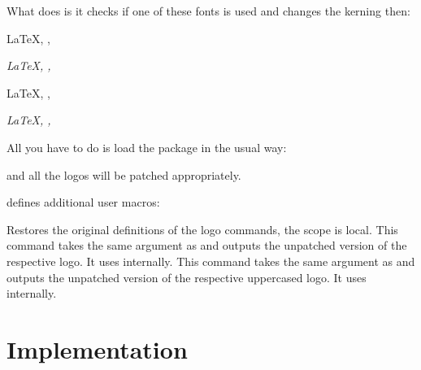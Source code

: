 \documentclass{cnpkgdoc}
\begin{document}
What \lbthlpt does is it checks if one of these fonts is used and changes the
kerning then:

\begin{beispiel}
 \huge
 \LaTeX, \XeLaTeX, \LaTeXTeX \par
 \textit{\LaTeX, \XeLaTeX, \LaTeXTeX}
 
 \sffamily
 \LaTeX, \XeLaTeX, \LaTeXTeX \par
 \textit{\LaTeX, \XeLaTeX, \LaTeXTeX}
\end{beispiel}

All you have to do is load the package in the usual \LaTeXe{} way:
\begin{beispiel}
 \usepackage{libertinehologopatch}
\end{beispiel}
and all the logos will be patched appropriately.

\lbthlpt defines additional user macros:
\begin{beschreibung}
 \newline
   Restores the original definitions of the logo commands, the scope is local.
 \newline
   This command takes the same argument as  and outputs the unpatched
   version of the respective logo. It uses  internally.
 \newline
   This command takes the same argument as  and outputs the unpatched
   version of the respective uppercased logo. It uses  internally.
\end{beschreibung}

\section{Implementation}
\implementation

\printindex
\end{document}
